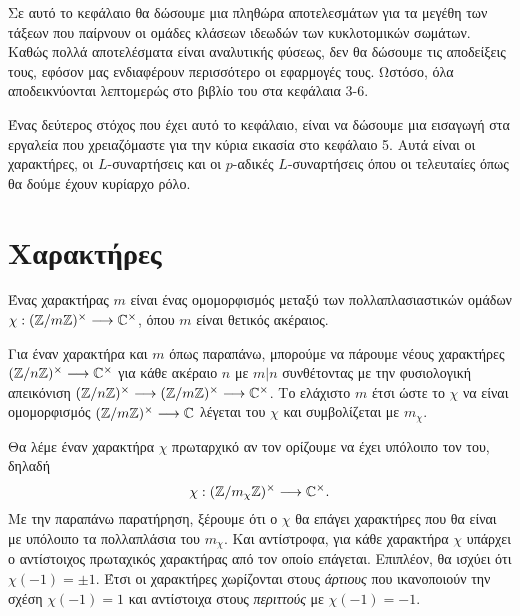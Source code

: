 

Σε αυτό το κεφάλαιο θα δώσουμε μια πληθώρα αποτελεσμάτων για τα μεγέθη των τάξεων που παίρνουν οι ομάδες κλάσεων ιδεωδών των κυκλοτομικών σωμάτων. 
Καθώς πολλά αποτελέσματα είναι αναλυτικής φύσεως, δεν θα δώσουμε τις αποδείξεις τους, εφόσον μας ενδιαφέρουν περισσότερο οι εφαρμογές τους. Ωστόσο, 
όλα αποδεικνύονται λεπτομερώς στο βιβλίο του  \cite{Wash} στα κεφάλαια 3-6.

Ένας δεύτερος στόχος που έχει αυτό το κεφάλαιο, είναι να δώσουμε μια εισαγωγή στα εργαλεία που χρειαζόμαστε για την κύρια εικασία στο κεφάλαιο 5. Αυτά 
είναι οι χαρακτήρες, οι $L$-συναρτήσεις και οι $p$-αδικές $L$-συναρτήσεις όπου οι τελευταίες όπως θα δούμε έχουν κυρίαρχο ρόλο.

\section{Χαρακτήρες}

\begin{defn}
	Ένας χαρακτήρας   $m$ είναι ένας ομομορφισμός μεταξύ των πολλαπλασιαστικών ομάδων $\chi:(\mathbb{Z}/m\mathbb{Z})^{\times} \longrightarrow \mathbb{C}^{\times}$, όπου $m$ είναι θετικός ακέραιος.
\end{defn}

\noindent Για έναν χαρακτήρα  και $m$ όπως παραπάνω, μπορούμε να πάρουμε νέους χαρακτήρες $(\mathbb{Z}/n\mathbb{Z})^\times \longrightarrow 
\mathbb{C}^\times$ για κάθε ακέραιο $n$ με $m|n$ συνθέτοντας με την φυσιολογική απεικόνιση $(\mathbb{Z}/n\mathbb{Z})^\times \longrightarrow 
(\mathbb{Z}/m\mathbb{Z})^\times \longrightarrow \mathbb{C}^\times$. Το ελάχιστο $m$ έτσι ώστε το $\chi$ να είναι ομομορφισμός $(\mathbb{Z}/m\mathbb{Z})^\times \longrightarrow 
\mathbb{C}$ λέγεται  του $\chi$ και συμβολίζεται με $m_{\chi}$. 

Θα λέμε έναν χαρακτήρα $\chi$ πρωταρχικό αν τον ορίζουμε να έχει υπόλοιπο τον  του, δηλαδή
$$\chi : (\mathbb{Z}/m_{\chi}\mathbb{Z})^{\times} \longrightarrow \mathbb{C}^\times.$$ Με την παραπάνω παρατήρηση, ξέρουμε ότι ο $\chi$ θα επάγει χαρακτήρες 
που θα είναι με υπόλοιπο τα πολλαπλάσια του $m_\chi$. Και αντίστροφα, 
για κάθε χαρακτήρα $\chi$ υπάρχει ο αντίστοιχος πρωταχικός χαρακτήρας από τον οποίο επάγεται. Επιπλέον, θα ισχύει ότι $\chi(-1) =\pm 1$. Έτσι οι χαρακτήρες χωρίζονται 
στους {\em άρτιους} που ικανοποιούν την σχέση $\chi(-1)=1$ και αντίστοιχα στους {\em περιττούς} με $\chi(-1)=-1$.

